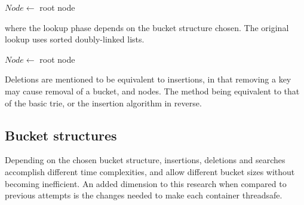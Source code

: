 \begin{algorithm}[H]
    \caption{$k$\FuncSty{)}}
    \label{alg:bt_search}

    $Node \leftarrow$  root node\;
\end{algorithm}

where the lookup phase depends on the bucket structure chosen. The original
lookup uses sorted doubly-linked lists. 

\begin{algorithm}[H]
    \caption{$k$\FuncSty{)}}
    \label{alg:bt_insert}


    $Node \leftarrow$  root node\;
\end{algorithm}

Deletions are mentioned to be equivalent to insertions, in that removing a key
may cause removal of a bucket, and nodes. The method being equivalent to that
of the basic trie, or the insertion algorithm in reverse.

\begin{algorithm}[H]
    \caption{$b$\FuncSty{)}}
    \label{alg:bt_burst}

\end{algorithm}


\subsection{Bucket structures}
Depending on the chosen bucket structure, insertions, deletions and searches
accomplish different time complexities, and allow different bucket sizes
without becoming inefficient.
An added dimension to this research when compared to previous attempts is the
changes needed to make each container threadsafe.

